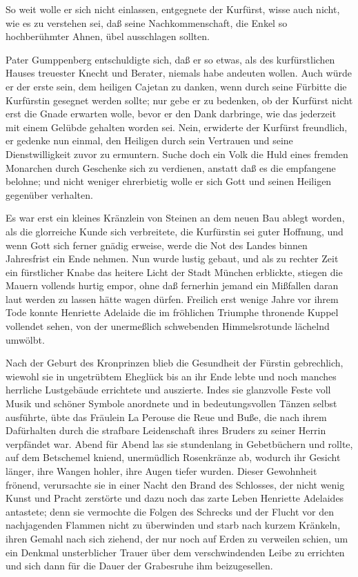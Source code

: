 So weit wolle er sich nicht einlassen, entgegnete der Kurfürst,
wisse auch nicht, wie es zu verstehen sei, daß seine
Nachkommenschaft, die Enkel so hochberühmter Ahnen, übel
ausschlagen sollten.

Pater Gumppenberg entschuldigte sich, daß er so etwas, als des
kurfürstlichen Hauses treuester Knecht und Berater, niemals habe
andeuten wollen. Auch würde er der erste sein, dem heiligen Cajetan
zu danken, wenn durch seine Fürbitte \pagenum{[122]} die Kurfürstin
gesegnet werden sollte; nur gebe er zu bedenken, ob der Kurfürst
nicht erst die Gnade erwarten wolle, bevor er den Dank darbringe,
wie das jederzeit mit einem Gelübde gehalten worden sei. Nein,
erwiderte der Kurfürst freundlich, er gedenke nun einmal, den
Heiligen durch sein Vertrauen und seine Dienstwilligkeit zuvor zu
ermuntern. Suche doch ein Volk die Huld eines fremden Monarchen
durch Geschenke sich zu verdienen, anstatt daß es die empfangene
belohne; und nicht weniger ehrerbietig wolle er sich Gott und
seinen Heiligen gegenüber verhalten.

Es war erst ein kleines Kränzlein von Steinen an dem neuen Bau
ablegt worden, als die glorreiche Kunde sich verbreitete, die
Kurfürstin sei guter Hoffnung, und wenn Gott sich ferner gnädig
erweise, werde die Not des Landes binnen Jahresfrist ein Ende
nehmen. Nun wurde lustig gebaut, und als zu rechter Zeit ein
fürstlicher Knabe das heitere Licht der Stadt München erblickte,
stiegen die Mauern vollends hurtig empor, ohne daß fernerhin jemand
ein Mißfallen daran laut werden zu lassen hätte wagen dürfen.
Freilich erst wenige Jahre vor ihrem Tode konnte Henriette Adelaide
die im fröhlichen Triumphe thronende Kuppel vollendet sehen, von
der unermeßlich schwebenden Himmelsrotunde lächelnd umwölbt.

Nach der Geburt des Kronprinzen blieb die Gesundheit der Fürstin
gebrechlich, wiewohl sie in ungetrübtem Eheglück bis an ihr Ende
lebte und noch manches herrliche Lustgebäude errichtete und
auszierte. Indes sie glanzvolle Feste voll Musik und schöner
Symbole anordnete und in bedeutungsvollen Tänzen selbst ausführte,
übte das Fräulein La Perouse die Reue und Buße, die nach ihrem
Dafürhalten durch die strafbare Leidenschaft ihres Bruders zu
seiner \pagenum{[123]} Herrin verpfändet war. Abend für Abend las
sie stundenlang in Gebetbüchern und rollte, auf dem Betschemel
kniend, unermüdlich Rosenkränze ab, wodurch ihr Gesicht länger,
ihre Wangen hohler, ihre Augen tiefer wurden. Dieser Gewohnheit
frönend, verursachte sie in einer Nacht den Brand des Schlosses,
der nicht wenig Kunst und Pracht zerstörte und dazu noch das zarte
Leben Henriette Adelaides antastete; denn sie vermochte die Folgen
des Schrecks und der Flucht vor den nachjagenden Flammen nicht zu
überwinden und starb nach kurzem Kränkeln, ihren Gemahl nach sich
ziehend, der nur noch auf Erden zu verweilen schien, um ein Denkmal
unsterblicher Trauer über dem verschwindenden Leibe zu errichten
und sich dann für die Dauer der Grabesruhe ihm beizugesellen.


